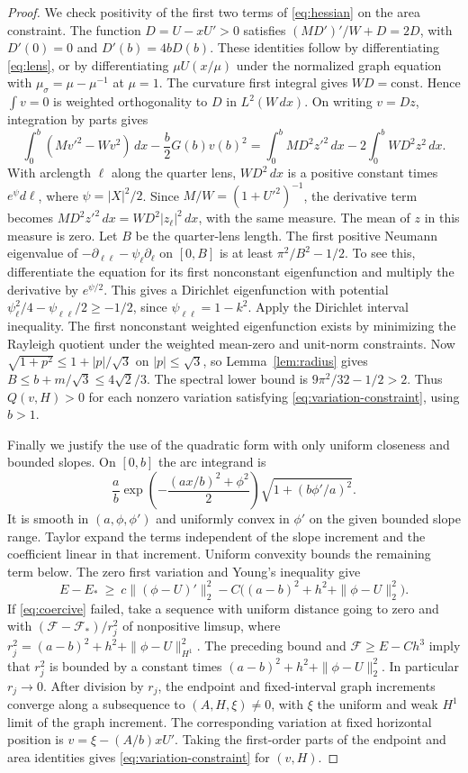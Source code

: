 \begin{proof}
We check positivity of the first two terms of \eqref{eq:hessian}
on the area constraint. The function \(D=U-xU'>0\) satisfies
\((MD')'/W+D=2D\), with \(D'(0)=0\) and \(D'(b)=4bD(b)\).
These identities follow by differentiating \eqref{eq:lens}, or by
differentiating \(\mu U(x/\mu)\) under the normalized graph equation
with \(\mu_\sigma=\mu-\mu^{-1}\) at \(\mu=1\).
The curvature first integral gives \(WD=\mathrm{const}\).
Hence \(\int v=0\) is weighted orthogonality to \(D\) in
\(L^2(W\,dx)\). On writing \(v=D z\), integration by parts gives
\[
 \int_0^b(Mv'^2-Wv^2)\,dx-\frac b2G(b)v(b)^2
 =\int_0^b MD^2 z'^2\,dx-2\int_0^b WD^2 z^2\,dx .
\]
With arclength \(\ell\) along the quarter lens, \(WD^2\,dx\) is
a positive constant times \(e^\psi d\ell\), where \(\psi=|X|^2/2\).
Since \(M/W=(1+U'^2)^{-1}\), the derivative term becomes
\(MD^2 z'^2\,dx=WD^2|z_\ell|^2\,dx\), with the same measure.
The mean of \(z\) in this measure is zero.
Let \(B\) be the quarter-lens length. The first positive Neumann
eigenvalue of \(-\partial_{\ell\ell}-\psi_\ell\partial_\ell\) on
\([0,B]\) is at least \(\pi^2/B^2-1/2\). To see this, differentiate
the equation for its first nonconstant eigenfunction and multiply
the derivative by \(e^{\psi/2}\). This gives a Dirichlet eigenfunction
with potential \(\psi_\ell^2/4-\psi_{\ell\ell}/2\ge-1/2\), since
\(\psi_{\ell\ell}=1-k^2\). Apply the Dirichlet interval inequality.
The first nonconstant weighted eigenfunction exists by minimizing the
Rayleigh quotient under the weighted mean-zero and unit-norm
constraints. Now \(\sqrt{1+p^2}\le1+|p|/\sqrt3\) on
\(|p|\le\sqrt3\), so Lemma~\ref{lem:radius} gives
\(B\le b+m/\sqrt3\le4\sqrt2/3\). The spectral lower bound is
\(9\pi^2/32-1/2>2\). Thus \(Q(v,H)>0\) for each nonzero variation
satisfying \eqref{eq:variation-constraint}, using \(b>1\).

Finally we justify the use of the quadratic form with only uniform
closeness and bounded slopes. On \([0,b]\) the arc integrand is
\[
 \frac{a}{b}\exp\!\left(-\frac{(ax/b)^2+\phi^2}{2}\right)
       \sqrt{1+(b\phi'/a)^2}.
\]
It is smooth in \((a,\phi,\phi')\) and uniformly convex in \(\phi'\)
on the given bounded slope range. Taylor expand the terms independent
of the slope increment and the coefficient linear in that increment.
Uniform convexity bounds the remaining term below. The zero first
variation and Young's inequality give
\[
 E-E_*\ \ge\ c\|(\phi-U)'\|_2^2
          -C\big((a-b)^2+h^2+\|\phi-U\|_2^2\big).
\]
If \eqref{eq:coercive} failed, take a sequence with uniform distance
going to zero and with \((\mathcal F-\mathcal F_*)/r_j^2\) of
nonpositive limsup, where \(r_j^2=(a-b)^2+h^2+\|\phi-U\|_{H^1}^2\).
The preceding bound and \(\mathcal F\ge E-Ch^3\) imply that \(r_j^2\)
is bounded by a constant times \((a-b)^2+h^2+\|\phi-U\|_2^2\).
In particular \(r_j\to0\). After division by \(r_j\), the endpoint
and fixed-interval graph increments converge along a subsequence
to \((A,H,\xi)\ne0\), with \(\xi\) the uniform and weak \(H^1\) limit
of the graph increment. The corresponding variation at fixed horizontal
position is \(v=\xi-(A/b)xU'\). Taking the first-order parts of the endpoint
and area identities gives \eqref{eq:variation-constraint} for \((v,H)\).


\end{proof}
